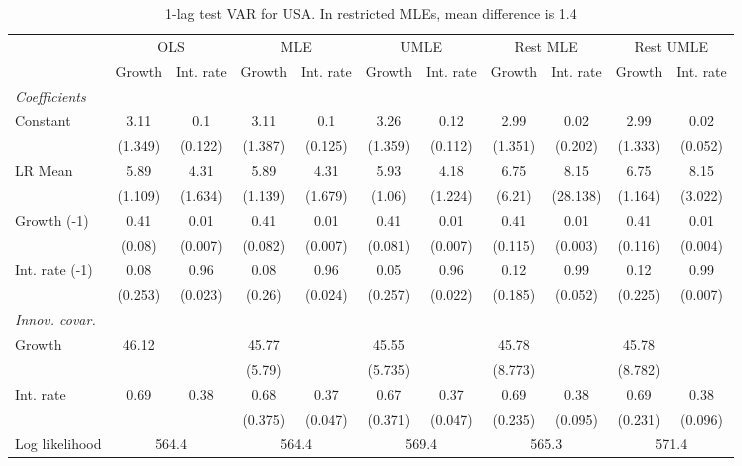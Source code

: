\begin{table}[htbp] 
	\centering
	\begin{tabular}{@{\extracolsep{4pt}}lcccccccccc@{}}		\hline\hline
		 		 & \multicolumn{2}{c}{OLS} &\multicolumn{2}{c}{MLE} &\multicolumn{2}{c}{UMLE} &\multicolumn{2}{c}{Rest MLE} &\multicolumn{2}{c}{Rest UMLE} \\ 
 		 & Growth 	 & Int. rate 	 & Growth 	 & Int. rate 	 & Growth 	 & Int. rate 	 & Growth 	 & Int. rate 	 & Growth 	 & Int. rate\\\cline{2-3}\cline{4-5}\cline{6-7}\cline{8-9}\cline{10-11}
\rule{0pt}{4ex} 
 \emph{Coefficients} 	  		 & 		 & 		 & 		 & 		 & 		 & 		 & 		 & 		 & 		 &\\ 
\quad Constant 	 & 3.11 	 & 0.1 	 & 3.11 	 & 0.1 	 & 3.26 	 & 0.12 	 & 2.99 	 & 0.02 	 & 2.99 	 & 0.02	 \\ 
 		 & (1.349) 	 & (0.122) 	 & (1.387) 	 & (0.125) 	 & (1.359) 	 & (0.112) 	 & (1.351) 	 & (0.202) 	 & (1.333) 	 & (0.052) 	 \\ 
\quad LR Mean 	 & 5.89 	 & 4.31 	 & 5.89 	 & 4.31 	 & 5.93 	 & 4.18 	 & 6.75 	 & 8.15 	 & 6.75 	 & 8.15	 \\ 
 		 & (1.109) 	 & (1.634) 	 & (1.139) 	 & (1.679) 	 & (1.06) 	 & (1.224) 	 & (6.21) 	 & (28.138) 	 & (1.164) 	 & (3.022) 	 \\ 
\quad Growth (-1) 	 &0.41 	 & 0.01 	 & 0.41 	 & 0.01 	 & 0.41 	 & 0.01 	 & 0.41 	 & 0.01 	 & 0.41 	 & 0.01	 \\ 
 		 & (0.08) 	 & (0.007) 	 & (0.082) 	 & (0.007) 	 & (0.081) 	 & (0.007) 	 & (0.115) 	 & (0.003) 	 & (0.116) 	 & (0.004) 	 \\ 
\quad Int. rate (-1) 	 &0.08 	 & 0.96 	 & 0.08 	 & 0.96 	 & 0.05 	 & 0.96 	 & 0.12 	 & 0.99 	 & 0.12 	 & 0.99	 \\ 
 		 & (0.253) 	 & (0.023) 	 & (0.26) 	 & (0.024) 	 & (0.257) 	 & (0.022) 	 & (0.185) 	 & (0.052) 	 & (0.225) 	 & (0.007) 	 \\ 
\rule{0pt}{4ex} \emph{Innov. covar.}  	 & 	 & 	 & 	 & 	 & 	 & 	 & 	 & 	 & 	 &\\ 
\quad Growth 	 &46.12 	 &  	 & 45.77 	 &  	 & 45.55 	 &  	 & 45.78 	 &  	 & 45.78 	 & 	 \\ 
 		 &  	 &  	 & (5.79) 	 &  	 & (5.735) 	 &  	 & (8.773) 	 &  	 & (8.782) 	 &  	 \\ 
\quad Int. rate 	 &0.69 	 & 0.38 	 & 0.68 	 & 0.37 	 & 0.67 	 & 0.37 	 & 0.69 	 & 0.38 	 & 0.69 	 & 0.38	 \\ 
 		 &  	 &  	 & (0.375) 	 & (0.047) 	 & (0.371) 	 & (0.047) 	 & (0.235) 	 & (0.095) 	 & (0.231) 	 & (0.096) 	 \\ 
 \hline \rule{0pt}{4ex} 
  Log likelihood 	 &\multicolumn{2}{c}{564.4} 	 & \multicolumn{2}{c}{564.4} 	 & \multicolumn{2}{c}{569.4} 	 & \multicolumn{2}{c}{565.3} 	 & \multicolumn{2}{c}{571.4}\\ 

 \hline 	\end{tabular}		\caption{1-lag test VAR for USA. In restricted MLEs, mean difference is 1.4}
		\label{tab:USA1}

\end{table}